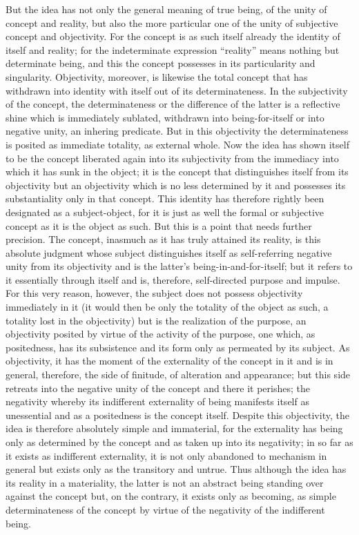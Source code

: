 But the idea has not only
the general meaning of true being,
of the unity of concept and reality,
but also the more particular one
of the unity of subjective concept and objectivity.
For the concept is as such itself
already the identity of itself and reality;
for the indeterminate expression “reality”
means nothing but determinate being,
and this the concept possesses
in its particularity and singularity.
Objectivity, moreover, is likewise the total concept
that has withdrawn into identity with itself
out of its determinateness.
In the subjectivity of the concept,
the determinateness
or the difference of the latter is
a reflective shine which is immediately sublated,
withdrawn into being-for-itself
or into negative unity,
an inhering predicate.
But in this objectivity the determinateness is
posited as immediate totality, as external whole.
Now the idea has shown itself to be the concept
liberated again into its subjectivity
from the immediacy into which it has sunk in the object;
it is the concept that
distinguishes itself from its objectivity
but an objectivity which is no less determined by it
and possesses its substantiality only in that concept.
This identity has therefore rightly been
designated as a subject-object,
for it is just as well the formal
or subjective concept
as it is the object as such.
But this is a point that needs further precision.
The concept, inasmuch as it has truly attained its reality,
is this absolute judgment whose subject distinguishes itself
as self-referring negative unity from its objectivity
and is the latter's being-in-and-for-itself;
but it refers to it essentially through itself
and is, therefore, self-directed purpose and impulse.
For this very reason, however,
the subject does not possess objectivity immediately in it
(it would then be only the totality of the object as such,
a totality lost in the objectivity)
but is the realization of the purpose,
an objectivity posited by virtue of
the activity of the purpose,
one which, as positedness, has its
subsistence and its form only as
permeated by its subject.
As objectivity, it has the moment of the externality
of the concept in it and is in general,
therefore, the side of finitude,
of alteration and appearance;
but this side retreats into the negative unity of
the concept and there it perishes;
the negativity whereby its indifferent
externality of being manifests itself as unessential
and as a positedness is the concept itself.
Despite this objectivity, the idea is therefore
absolutely simple and immaterial,
for the externality has being only
as determined by the concept
and as taken up into its negativity;
in so far as it exists as indifferent externality,
it is not only abandoned to mechanism in general
but exists only as the transitory and untrue.
Thus although the idea
has its reality in a materiality,
the latter is not an abstract being standing
over against the concept
but, on the contrary, it exists only as becoming,
as simple determinateness of the concept
by virtue of the negativity of the indifferent being.

